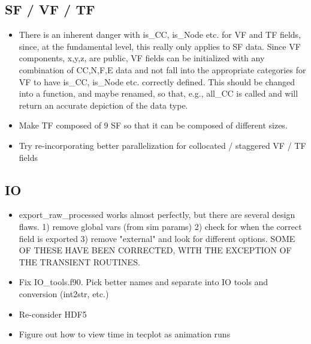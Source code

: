 \documentclass[11pt]{article}
\begin{document}
\subsection{SF / VF / TF}
\begin{itemize}
\setlength\itemsep{-1em}
\item There is an inherent danger with is\_CC, is\_Node etc. for VF and TF fields, since, at the fundamental level, this really only applies to SF data. Since VF components, x,y,z, are public, VF fields can be initialized with any combination of CC,N,F,E data and not fall into the appropriate categories for VF to have is\_CC, is\_Node etc. correctly defined. This should be changed into a function, and maybe renamed, so that, e.g., all\_CC is called and will return an accurate depiction of the data type.
\item Make TF composed of 9 SF so that it can be composed of different sizes.
\item Try re-incorporating better parallelization for collocated / staggered VF / TF fields
\end{itemize}

\subsection{IO}
\begin{itemize}
\setlength\itemsep{-1em}
\item export\_raw\_processed works almost perfectly, but there are several design flaws. 1) remove global vars (from sim params) 2) check for when the correct field is exported 3) remove "external" and look for different options. SOME OF THESE HAVE BEEN CORRECTED, WITH THE EXCEPTION OF THE TRANSIENT ROUTINES.
\item Fix IO\_tools.f90. Pick better names and separate into IO tools and conversion (int2str, etc.)
\item Re-consider HDF5
\item Figure out how to view time in tecplot as animation runs
\end{itemize}
\end{document}
